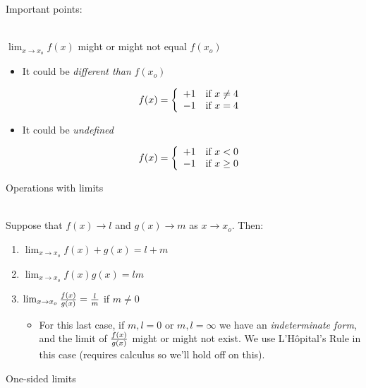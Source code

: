\documentclass[10pt]{seminar}
\begin{document}
\begin{slide}
\newslide
Important points:

\ \\$\lim_{x\rightarrow x_o}f(x)$ might or might not equal $f(x_o)$

\begin{itemize}
\item It could be \textit{different than} $f(x_o)$

 \[
    f(x)=\left\{
                \begin{array}{lll}
                  +1&\hbox{if } x\not=4\\
                  -1&\hbox{if } x=4
                \end{array}
              \right.
  \]


\item It could be \textit{undefined}

 \[
    f(x)=\left\{
                \begin{array}{lll}
                  +1&\hbox{if } x<0\\
                  -1&\hbox{if } x\geq 0
                \end{array}
              \right.
  \]

\end{itemize}


\newslide
Operations with limits

\ \\Suppose that $f(x)\rightarrow l$ and $g(x)\rightarrow m$ as $x\rightarrow x_o$.  Then:

\begin{enumerate}
\item $\lim_{x\rightarrow x_o} f(x)+g(x)=l+m$
\item $\lim_{x\rightarrow x_o}f(x)g(x)=lm$
\item $\lim_{x\rightarrow x_o}{{f(x)}\over{g(x)}}={l\over m}$ if $m\not=0$

\begin{itemize}
\item For this last case, if $m, l=0$ or $m, l=\infty$ we have an \textit{indeterminate form}, and the limit of ${{f(x)}\over{g(x)}}$ might or might not exist. We use L'H\^opital's Rule in this case (requires calculus so we'll hold off on this). 
\end{itemize}
\end{enumerate}

\newslide

One-sided limits


\end{slide}
\end{document}
